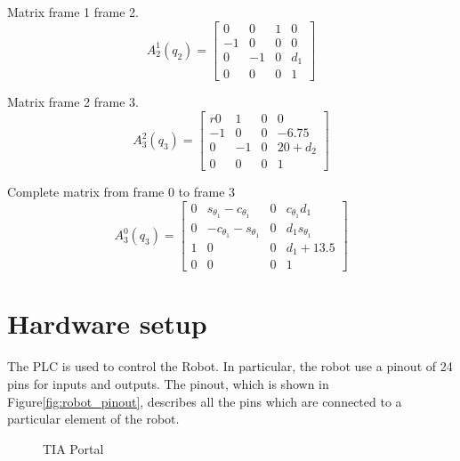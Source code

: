 Matrix frame 1 frame 2.
\begin{equation}
    A_2^{1}(q_2) = 
    \begin{bmatrix}
   0 & 0 & 1 &0\\
   -1 & 0 & 0 &0\\
     0 & -1 & 0 &d_1\\
    0&0&0&1
    \end{bmatrix}
\end{equation}

Matrix frame 2 frame 3.
\begin{equation}
    A_3^{2}(q_3) = 
    \begin{bmatrix}
r   0 & 1 & 0 &0\\
   -1 & 0 & 0 &-6.75\\
     0 & -1 & 0 &20+d_2\\
    0&0&0&1
    \end{bmatrix}
\end{equation}

Complete matrix from frame 0 to frame 3
\begin{equation}
    A_3^{0}(q_3) = 
    \begin{bmatrix}
   0 &  s_{\theta_1}-c_{\theta_1} & 0 & c_{\theta_1} d_1\\
   0 & -c_{\theta_1}-s_{\theta_1} & 0 &d_1s_{\theta_1}\\
     1 & 0 & 0 &d_1+13.5\\
    0&0&0&1
    \end{bmatrix}
\end{equation}

\section{Hardware setup}

The PLC is used to control the Robot. In particular, the robot use a pinout of 24 pins for inputs and outputs. The pinout, which is shown in Figure\ref{fig:robot_pinout}, describes all the pins which are connected to a particular element of the robot. 

\begin{figure}[!h]
\centering
{}
\qquad
{}
\caption{TIA Portal}
\label{first_signal}
\end{figure}

